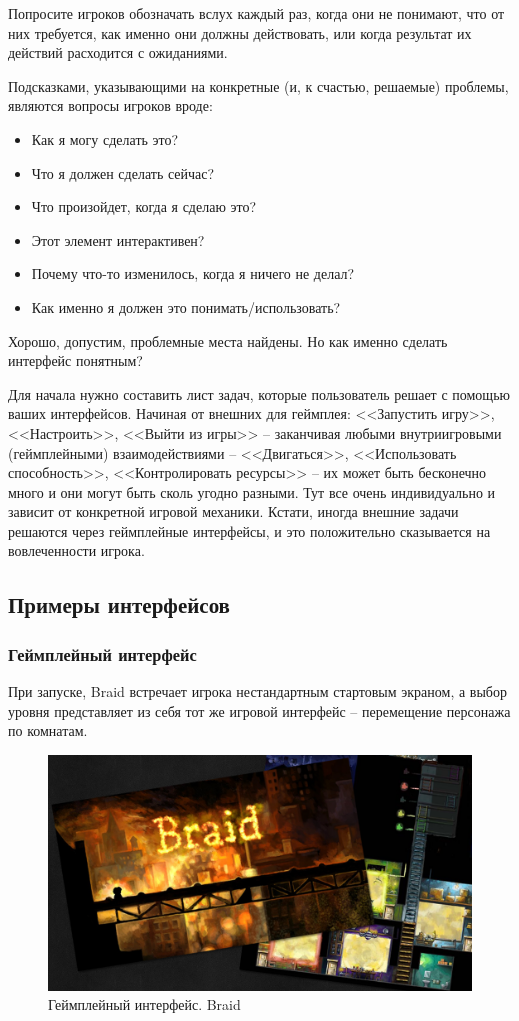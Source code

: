 \documentclass{article}
\begin{document}
Попросите игроков обозначать вслух каждый раз, когда они не понимают, что от них требуется, как именно они должны действовать, или когда результат их действий расходится с ожиданиями.

Подсказками, указывающими на конкретные (и, к счастью, решаемые) проблемы, являются вопросы игроков вроде:
\begin{itemize}
  \item Как я могу сделать это?
  \item Что я должен сделать сейчас?
  \item Что произойдет, когда я сделаю это?
  \item Этот элемент интерактивен?
  \item Почему что-то изменилось, когда я ничего не делал?
  \item Как именно я должен это понимать/использовать?
\end{itemize}

Хорошо, допустим, проблемные места найдены. Но как именно сделать интерфейс понятным?

Для начала нужно составить лист задач, которые пользователь решает с помощью ваших интерфейсов. Начиная от внешних для геймплея: <<Запустить игру>>, <<Настроить>>, <<Выйти из игры>> -- заканчивая любыми внутриигровыми (геймплейными) взаимодействиями -- <<Двигаться>>, <<Использовать способность>>, <<Контролировать ресурсы>> -- их может быть бесконечно много и они могут быть сколь угодно разными. Тут все очень индивидуально и зависит от конкретной игровой механики. Кстати, иногда внешние задачи решаются через геймплейные интерфейсы, и это положительно сказывается на вовлеченности игрока.

\subsection{Примеры интерфейсов}
\subsubsection*{Геймплейный интерфейс}
 При запуске, Braid встречает игрока нестандартным стартовым экраном, а выбор уровня представляет из себя тот же игровой интерфейс -- перемещение персонажа по комнатам.

\begin{figure}[H]
  \includegraphics[width=\textwidth]{res/img/braid.png}
  \caption{Геймплейный интерфейс. Braid}
\end{figure}
\end{document}
